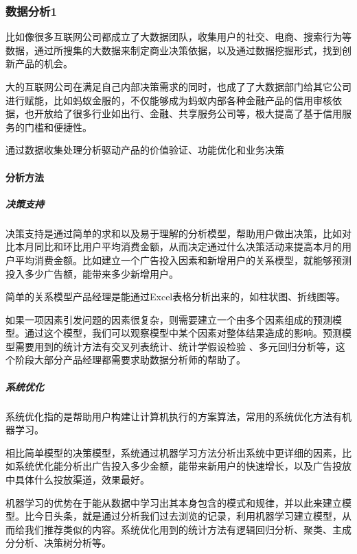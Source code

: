 \documentclass[letterpaper,11pt,english]{sphinxmanual}
\begin{document}
\subsubsection{数据分析1\sphinxfootnotemark[111]}
\label{\detokenize{chapter_idea/data:id1}}\label{\detokenize{chapter_idea/data::doc}}%
\begin{footnotetext}[111]\sphinxAtStartFootnote
{}
%
\end{footnotetext}\ignorespaces 
比如像很多互联网公司都成立了大数据团队，收集用户的社交、电商、搜索行为等数据，通过所搜集的大数据来制定商业决策依据，以及通过数据挖掘形式，找到创新产品的机会。

大的互联网公司在满足自己内部决策需求的同时，也成了了大数据部门给其它公司进行赋能，比如蚂蚁金服的，不仅能够成为蚂蚁内部各种金融产品的信用审核依据，也开放给了很多行业如出行、金融、共享服务公司等，极大提高了基于信用服务的门槛和便捷性。

通过数据收集处理分析驱动产品的价值验证、功能优化和业务决策


\paragraph{分析方法}
\label{\detokenize{chapter_idea/data:id2}}

\subparagraph{决策支持}
\label{\detokenize{chapter_idea/data:id3}}
决策支持是通过简单的求和以及易于理解的分析模型，帮助用户做出决策，比如对比本月同比和环比用户平均消费金额，从而决定通过什么决策活动来提高本月的用户平均消费金额。比如建立一个广告投入因素和新增用户的关系模型，就能够预测投入多少广告额，能带来多少新增用户。

简单的关系模型产品经理是能通过Excel表格分析出来的，如柱状图、折线图等。

如果一项因素引发问题的因素很复杂，则需要建立一个由多个因素组成的预测模型。通过这个模型，我们可以观察模型中某个因素对整体结果造成的影响。预测模型需要用到的统计方法有交叉列表统计、统计学假设检验
、多元回归分析等，这个阶段大部分产品经理都需要求助数据分析师的帮助了。


\subparagraph{系统优化}
\label{\detokenize{chapter_idea/data:id4}}
系统优化指的是帮助用户构建让计算机执行的方案算法，常用的系统优化方法有机器学习。

相比简单模型的决策模型，系统通过机器学习方法分析出系统中更详细的因素，比如系统优化能分析出广告投入多少金额，能带来新用户的快速增长，以及广告投放中具体什么投放渠道，效果最好。

机器学习的优势在于能从数据中学习出其本身包含的模式和规律，并以此来建立模型。比今日头条，就是通过分析我们过去浏览的记录，利用机器学习建立模型，从而给我们推荐类似的内容。系统优化用到的统计方法有逻辑回归分析、聚类、主成分分析、决策树分析等。
\end{document}
